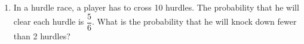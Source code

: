 \begin{enumerate}[label=\thechapter.\arabic*,ref=\thechapter.\theenumi]
\item 
In a hurdle race, a player has to cross 10 hurdles. The probability that he will clear each hurdle is $\dfrac{5}{6}$. What is the probability that he will knock down fewer than 2 hurdles?
\end{enumerate}
